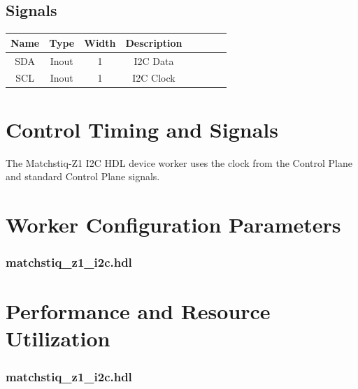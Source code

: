 \documentclass{article}
\def\comp{matchstiq\_z1\_i2c}
\edef\ecomp{matchstiq_z1_i2c}
\begin{document}
\begin{landscape}
	\section*{Signals}
	\begin{scriptsize}
	\begin{tabular}{|c|c|c|c|p{2.6cm}|c|c|c|}
		\hline
		\rowcolor{blue}
		Name & Type  & Width & Description \\
		\hline
		SDA  & Inout & 1     & I2C Data    \\
		\hline
		SCL  & Inout & 1     & I2C Clock   \\
		\hline
	\end{tabular}
	\end{scriptsize}
\end{landscape}

\section*{Control Timing and Signals}
The Matchstiq-Z1 I2C HDL device worker uses the clock from the Control Plane and standard Control Plane signals.

\begin{landscape}
\section*{Worker Configuration Parameters}
\subsubsection*{\comp.hdl}

\section*{Performance and Resource Utilization}
\subsubsection*{\comp.hdl}

\end{landscape}
\end{document}
